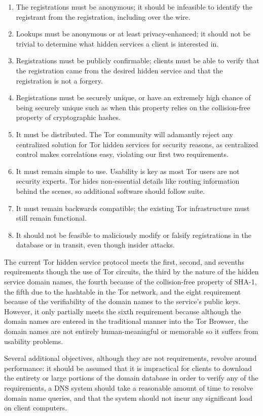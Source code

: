\begin{enumerate}
	\item The registrations must be anonymous; it should be infeasible to identify the registrant from the registration, including over the wire.
	\item Lookups must be anonymous or at least privacy-enhanced; it should not be trivial to determine what hidden services a client is interested in.
	\item Registrations must be publicly confirmable; clients must be able to verify that the registration came from the desired hidden service and that the registration is not a forgery.
	\item Registrations must be securely unique, or have an extremely high chance of being securely unique such as when this property relies on the collision-free property of cryptographic hashes.
	\item It must be distributed. The Tor community will adamantly reject any centralized solution for Tor hidden services for security reasons, as centralized control makes correlations easy, violating our first two requirements.
	\item It must remain simple to use. Usability is key as most Tor users are not security experts. Tor hides non-essential details like routing information behind the scenes, so additional software should follow suite.
	\item It must remain backwards compatible; the existing Tor infrastructure must still remain functional.
	\item It should not be feasible to maliciously modify or falsify registrations in the database or in transit, even though insider attacks.
\end{enumerate}

The current Tor hidden service protocol meets the first, second, and sevenths requirements though the use of Tor circuits, the third by the nature of the hidden service domain names, the fourth because of the collision-free property of SHA-1, the fifth due to the hashtable in the Tor network, and the eight requirement because of the verifiability of the domain names to the service's public keys. However, it only partially meets the sixth requirement because although the domain names are entered in the traditional manner into the Tor Browser, the domain names are not entirely human-meaningful or memorable so it suffers from usability problems. 

Several additional objectives, although they are not requirements, revolve around performance: it should be assumed that it is impractical for clients to download the entirety or large portions of the domain database in order to verify any of the requirements, a DNS system should take a reasonable amount of time to resolve domain name queries, and that the system should not incur any significant load on client computers.